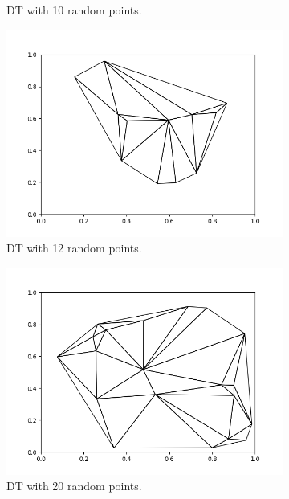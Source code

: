 \documentclass[]{article}
\begin{document}
\begin{figure}[ht]
\begin{subfigure}{0.30\textwidth}
        \caption{DT with 10 random points.}
        \label{fig:10}
    \end{subfigure}
    \hfill
    \begin{subfigure}{0.30\textwidth}
        \centering
        \includegraphics[width=\linewidth]{12p.png}
        \caption{DT with 12 random points.}
        \label{fig:12}
    \end{subfigure}    
    \hfill
    \begin{subfigure}{0.30\textwidth}
        \centering
        \includegraphics[width=\linewidth]{20p.png}
        \caption{DT with 20 random points.}
        \label{fig:20}
    \end{subfigure}
    \quad
    \begin{subfigure}{0.30\textwidth}

\end{subfigure}
\end{figure}
\end{document}
